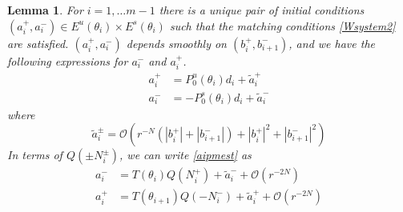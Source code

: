 \documentclass[12pt]{elsarticle}
\newtheorem{lemma}{Lemma}
\begin{document}
\begin{lemma}\label{inv2}
For $i = 1, \dots m-1$ there is a unique pair of initial conditions $(a_i^+, a_i^-) \in E^u(\theta_i) \times E^s(
\theta_i)$ such that the matching conditions \eqref{Wsystem2} are satisfied. $(a_i^+, a_i^-)$ depends smoothly on $(b_i^+, b_{i+1}^-)$, and we have the following expressions for $a_i^-$ and $a_i^+$. 
\begin{equation}\label{aipmest}
\begin{aligned}
a_i^+ &= P_0^u(\theta_i) d_i + \tilde{a}_i^+ \\
a_i^- &= -P_0^s(\theta_i) d_i + \tilde{a}_i^-
\end{aligned}
\end{equation}
where 
\begin{equation}\label{tildeaest}
\tilde{a}_i^\pm = \mathcal{O}(r^{-N}(|b_i^+|+|b_{i+1}^-|) + |b_i^+|^2+|b_{i+1}^-|^2) 
\end{equation}
In terms of $Q(\pm N_i^\pm)$, we can write \eqref{aipmest} as 
\begin{equation}\label{aipmexp}
\begin{aligned}
a_i^- &= T(\theta_i) Q(N_i^+) + \tilde{a}_i^- + \mathcal{O}(r^{-2N}) \\
a_i^+ &= T(\theta_{i+1}) Q(-N_i^-) + \tilde{a}_i^+ + \mathcal{O}(r^{-2N})
\end{aligned}
\end{equation}


\end{lemma}
\end{document}
